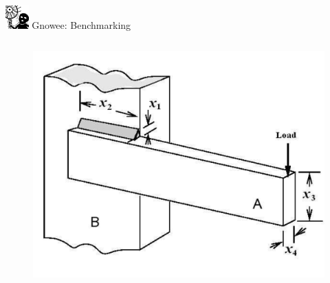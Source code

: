 \documentclass[xcolor=x11names,compress,handout]{beamer}
\renewcommand{\(}{\begin{columns}}
\renewcommand{\)}{\end{columns}}
\newcommand{\<}[1]{\begin{column}{#1}}
\renewcommand{\>}{\end{column}}
\begin{document}
\begin{frame}{\includegraphics[width=0.35in]{../figs/Gnowee.png} Gnowee: Benchmarking \cite{Walton2013a,Yang2014,Civicioglu2013}}
\begin{columns}
\begin{column}{0.33\linewidth}
\begin{figure}[htp]
      \end{figure}       
      \vspace{-0.75cm} 
      \begin{figure}[htp]
        \centering
        \includegraphics[width=1.0\textwidth, height=0.20\textheight]{../figs/WeldedBeam.png} 
      \end{figure}
    \end{column}
    

\end{columns}
\end{frame}
\end{document}
